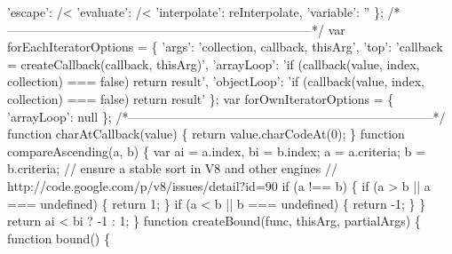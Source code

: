 \begin{DoxyCodeInclude}
\textcolor{stringliteral}{    'escape': /<%
\textcolor{stringliteral}{}
\textcolor{stringliteral}{    'evaluate': /<%
\textcolor{stringliteral}{}
\textcolor{stringliteral}{    'interpolate': reInterpolate,}
\textcolor{stringliteral}{}
\textcolor{stringliteral}{    'variable': ''}
\textcolor{stringliteral}{  \};}
\textcolor{stringliteral}{}
\textcolor{stringliteral}{  /*--------------------------------------------------------------------------*/}
\textcolor{stringliteral}{}
\textcolor{stringliteral}{  var forEachIteratorOptions = \{}
\textcolor{stringliteral}{    'args': 'collection, callback, thisArg',}
\textcolor{stringliteral}{    'top': 'callback = createCallback(callback, thisArg)',}
\textcolor{stringliteral}{    'arrayLoop': 'if (callback(value, index, collection) === false) return result',}
\textcolor{stringliteral}{    'objectLoop': 'if (callback(value, index, collection) === false) return result'}
\textcolor{stringliteral}{  \};}
\textcolor{stringliteral}{}
\textcolor{stringliteral}{  var forOwnIteratorOptions = \{}
\textcolor{stringliteral}{    'arrayLoop': null}
\textcolor{stringliteral}{  \};}
\textcolor{stringliteral}{}
\textcolor{stringliteral}{  /*--------------------------------------------------------------------------*/}
\textcolor{stringliteral}{}
\textcolor{stringliteral}{  function charAtCallback(value) \{}
\textcolor{stringliteral}{    return value.charCodeAt(0);}
\textcolor{stringliteral}{  \}}
\textcolor{stringliteral}{}
\textcolor{stringliteral}{  function compareAscending(a, b) \{}
\textcolor{stringliteral}{    var ai = a.index,}
\textcolor{stringliteral}{        bi = b.index;}
\textcolor{stringliteral}{}
\textcolor{stringliteral}{    a = a.criteria;}
\textcolor{stringliteral}{    b = b.criteria;}
\textcolor{stringliteral}{}
\textcolor{stringliteral}{    // ensure a stable sort in V8 and other engines}
\textcolor{stringliteral}{    // http://code.google.com/p/v8/issues/detail?id=90}
\textcolor{stringliteral}{    if (a !== b) \{}
\textcolor{stringliteral}{      if (a > b || a === undefined) \{}
\textcolor{stringliteral}{        return 1;}
\textcolor{stringliteral}{      \}}
\textcolor{stringliteral}{      if (a < b || b === undefined) \{}
\textcolor{stringliteral}{        return -1;}
\textcolor{stringliteral}{      \}}
\textcolor{stringliteral}{    \}}
\textcolor{stringliteral}{    return ai < bi ? -1 : 1;}
\textcolor{stringliteral}{  \}}
\textcolor{stringliteral}{}
\textcolor{stringliteral}{  function createBound(func, thisArg, partialArgs) \{}
\textcolor{stringliteral}{    function bound() \{}
}}
\end{DoxyCodeInclude}
